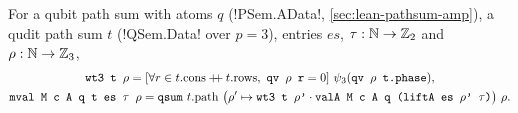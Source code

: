 \begin{definition}\label{def:lean-pathsum-mval}
For a qubit path sum with atoms $q$ (\lean!PSem.AData!, \cref{sec:lean-pathsum-amp}), a qudit path sum
$t$ (\lean!QSem.Data! over $p=3$), entries $es$, $\tau:\mathbb{N}\to\mathbb{Z}_{2}$ and $\rho:\mathbb{N}\to\mathbb{Z}_{3}$,
\begin{gather*}
\textnormal{\texttt{wt3 t \ensuremath{\rho}}} = [\forall r\in t.\mathrm{cons}\mathbin{+\!\!+}t.\mathrm{rows},\ \textnormal{\texttt{qv \ensuremath{\rho} r}}=0]\ \psi_3(\textnormal{\texttt{qv \ensuremath{\rho} t.phase}}),\\
\textnormal{\texttt{mval M c A q t es \ensuremath{\tau} \ensuremath{\rho}}} = \textnormal{\texttt{qsum}}\ t.\mathrm{path}\ \bigl(\rho'\mapsto\textnormal{\texttt{wt3 t \ensuremath{\rho}'}}\cdot\textnormal{\texttt{valA M c A q (liftA es \ensuremath{\rho}' \ensuremath{\tau})}}\bigr)\ \rho .
\end{gather*}
\end{definition}

